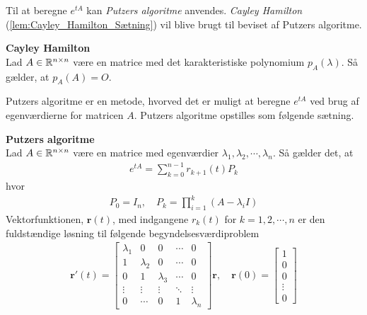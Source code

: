 Til at beregne $e^{tA}$ kan \textit{Putzers algoritme} anvendes.  
\textit{Cayley Hamilton} (\autoref{lem:Cayley_Hamilton_Sætning}) vil blive brugt til beviset af Putzers algoritme. 
\begin{lem}\textbf{Cayley Hamilton}\label{lem:Cayley_Hamilton_Sætning}\\
Lad $A \in \mathbb{R}^{n\times n}$ være en matrice med det karakteristiske polynomium $p_A(\lambda)$. Så gælder, at $p_A(A) = \textit{O}$.
\end{lem}

Putzers algoritme er en metode, hvorved det er muligt at beregne $e^{tA}$ ved brug af egenværdierne for matricen $A$. Putzers algoritme opstilles som følgende sætning.

\begin{thmx}\textbf{Putzers algoritme}\label{sæt:putzers_algoritme}\\
Lad $A \in \mathbb{R}^{n \times n}$ være en matrice med egenværdier $\lambda_1, \lambda_2, \cdots, \lambda_n$. Så gælder det, at
%
\begin{align}\label{eq:Putzer_algoritme}
    e^{tA} = \sum_{k=0}^{n-1}r_{k+1}(t)P_k
\end{align}
%
hvor
\begin{align}\label{eq:putzers_algoritme_P}
    P_0 = I_n, \quad P_k = \prod_{i=1}^k (A-\lambda_i I)
\end{align}
Vektorfunktionen, $\textbf{r}(t)$,  med indgangene $r_k(t)$ for $k=1, 2, \cdots, n$ er den fuldstændige løsning til følgende begyndelsesværdiproblem
%
\begin{align} \label{eq:putzers_algoritme_r(t)_begyndelsesværdiproblem}
    \textbf{r}'(t) = 
    \begin{bmatrix} 
        \lambda_1   &   0   & 0 & \cdots & 0\\
        1   & \lambda_2 & 0 & \cdots & 0\\
        0 & 1 & \lambda_3 & \cdots & 0\\
        \vdots & \vdots & \vdots & \ddots & \vdots\\
        0 & \cdots & 0 & 1 & \lambda_n
    \end{bmatrix}  \textbf{r} , \quad  \textbf{r}(0) = \begin{bmatrix} 1 \\ 0\\ 0\\ \vdots\\ 0 \end{bmatrix}
\end{align} 
\end{thmx}

